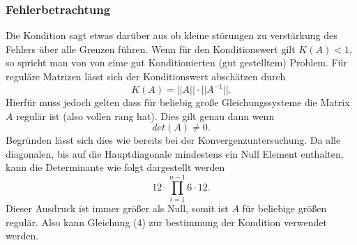 \documentclass[12pt,titlepage]{article}
\newcommand{\norm}[1]{\lvert #1 \rvert}
\begin{document}
	 		\subsubsection{Fehlerbetrachtung}
				Die Kondition sagt etwas darüber aus ob kleine störungen zu verstärkung des Fehlers über alle Grenzen führen. Wenn für den Konditionswert gilt $K(A) < 1$, so spricht man von
				von eime gut Konditionierten (gut gestelltem) Problem. Für reguläre Matrizen lässt sich der Konditionswert abschätzen durch
				\begin{equation}
					K(A) = \norm{\norm{A}}\cdot\norm{\norm{A^{-1}}}.
				\end{equation}
				Hierfür muss jedoch gelten dass für beliebig große Gleichungssysteme die Matrix $A$ regulär ist (also vollen rang hat). Dies gilt genau dann wenn
				\begin{equation*}
					det(A) \neq 0.
				\end{equation*}
				\newpage
				Begründen lässt sich dies wie bereits bei der Konvergenzuntersuchung. Da alle diagonalen, bis auf die Hauptdiagonale mindestens ein Null Element enthalten, kann
				die Determinante wie folgt dargestellt werden
				\begin{equation*}
					12\cdot\prod_{i=1}^{n-1}6 \cdot 12.
				\end{equation*}
				Dieser Ausdruck ist immer größer als Null, somit ist $A$ für beliebige größen regulär. Also kann Gleichung (4) zur bestimmung der Kondition verwendet werden.
				
\end{document}
